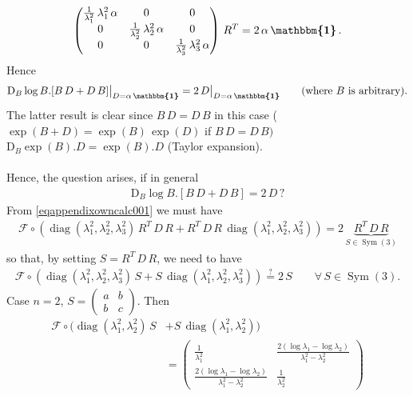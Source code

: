 \documentclass[10pt]{article}
\numberwithin{theoremCounter}{section}
\theoremstyle{plain}
\theoremstyle{definition}
\newcommand{\id}{{\boldsymbol{\mathbbm{1}}}}
\newcommand{\DD}{\mathrm{D}}
\DeclareMathOperator{\diag}{diag}
\DeclareMathOperator{\Sym}{Sym}
\numberwithin{equation}{section}
\begin{document}
\begin{appendix}
\begin{equation}
\begin{alignedat}{2}
\begin{pmatrix}
	\frac{1}{\lambda_1^2} \, \lambda_1^2 \, \alpha & 0 & 0 \\
	0 & \frac{1}{\lambda_2^2} \, \lambda_2^2 \, \alpha & 0 \\
	0 & 0 & \frac{1}{\lambda_3^2} \, \lambda_3^2 \, \alpha
	\end{pmatrix}
	\, R^T = 2 \, \alpha \, \id \, .
	\end{alignedat}
	\end{equation}
Hence
	\begin{align}
	\DD_B \log B . [B \, D + D \, B] \big\vert_{D = \alpha \, \id} = 2 \, D \big\vert_{D = \alpha \, \id} \qquad \textnormal{(where $B$ is arbitrary).}
	\end{align}
The latter result is clear since $B \, D = D \, B$ in this case ($\exp(B + D) = \exp(B) \, \exp(D)$ if $B \, D = D \, B)$ \\
%
$\DD_B \exp(B) . D = \exp(B) . D$ (Taylor expansion). \\
\\
Hence, the question arises, if in general
	\begin{align}
	\DD_B \log B . [B \, D + D \, B] = 2 \, D \, ?
	\end{align}
From \eqref{eqappendixowncalc001} we must have
	\begin{align}
	\mathcal{F} \circ (\diag(\lambda_1^2, \lambda_2^2, \lambda_3^2) \, R^T \, D \, R + R^T \, D \, R \, \diag(\lambda_1^2, \lambda_2^2, \lambda_3^2)) = 2 \, \underbrace{R^T \, D \, R}_{S \in \Sym(3)}
	\end{align}
so that, by setting $S = R^T \, D \, R$, we need to have
	\begin{align}
	\mathcal{F} \circ (\diag(\lambda_1^2, \lambda_2^2, \lambda_3^2) \, S + S \, \diag(\lambda_1^2, \lambda_2^2, \lambda_3^2)) \overset{?}{=} 2 \, S \qquad \forall \, S \in \Sym(3).
	\end{align}
Case $n=2$, $S = \begin{pmatrix} a & b \\ b & c \end{pmatrix}$. Then
	\begin{equation}
	\begin{alignedat}{2}
	\mathcal{F} \circ (\diag(\lambda_1^2, \lambda_2^2) \, S &+ S \, \diag(\lambda_1^2, \lambda_2^2)) \\
	&= 
	\begin{pmatrix}
	\frac{1}{\lambda_1^2} & \frac{2(\log \lambda_1 - \log \lambda_2)}{\lambda_1^2 - \lambda_2^2} \\
	\frac{2(\log \lambda_1 - \log \lambda_2)}{\lambda_1^2 - \lambda_2^2} & \frac{1}{\lambda_2^2}

\end{pmatrix}
\end{alignedat}
\end{equation}
\end{appendix}
\end{document}
